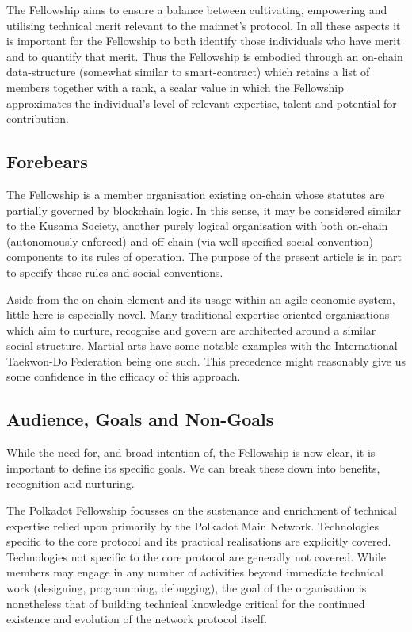 \documentclass[9pt,oneside]{amsart}
\begin{document}
The Fellowship aims to ensure a balance between cultivating, empowering and utilising technical merit relevant to the mainnet's protocol. In all these aspects it is important for the Fellowship to both identify those individuals who have merit and to quantify that merit. Thus the Fellowship is embodied through an on-chain data-structure (somewhat similar to smart-contract) which retains a list of members together with a rank, a scalar value in which the Fellowship approximates the individual's level of relevant expertise, talent and potential for contribution.

\subsection{Forebears}

The Fellowship is a member organisation existing on-chain whose statutes are partially governed by blockchain logic. In this sense, it may be considered similar to the Kusama Society, another purely logical organisation with both on-chain (autonomously enforced) and off-chain (via well specified social convention) components to its rules of operation. The purpose of the present article is in part to specify these rules and social conventions.

Aside from the on-chain element and its usage within an agile economic system, little here is especially novel. Many traditional expertise-oriented organisations which aim to nurture, recognise and govern are architected around a similar social structure. Martial arts have some notable examples with the International Taekwon-Do Federation being one such. This precedence might reasonably give us some confidence in the efficacy of this approach.

\subsection{Audience, Goals and Non-Goals}\label{goals}

While the need for, and broad intention of, the Fellowship is now clear, it is important to define its specific goals. We can break these down into benefits, recognition and nurturing.

The Polkadot Fellowship focusses on the sustenance and enrichment of technical expertise relied upon primarily by the Polkadot Main Network. Technologies specific to the core protocol and its practical realisations are explicitly covered. Technologies not specific to the core protocol are generally not covered. While members may engage in any number of activities beyond immediate technical work (designing, programming, debugging), the goal of the organisation is nonetheless that of building technical knowledge critical for the continued existence and evolution of the network protocol itself.
\end{document}

